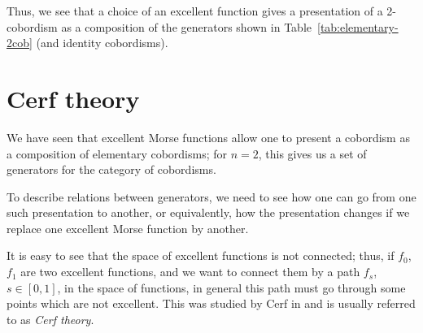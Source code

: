 Thus, we see that a choice of an excellent function gives a presentation of a
2-cobordism as a composition of the generators shown in
Table~\ref{tab:elementary-2cob} (and identity cobordisms).

\section{Cerf theory}\label{s:cerf}

We have seen that excellent Morse functions allow one to present a cobordism as
a composition of elementary cobordisms; for $n=2$, this gives us a set of
generators for the category of cobordisms.



To describe relations between generators, we need to see how one can go from
one such presentation to another, or equivalently, how the presentation changes
if we replace one excellent Morse function by another.

It is easy to see that the space of excellent functions is not connected; thus,
if $f_0$, $f_1$ are two excellent functions, and we want to connect them by a
path $f_s$, $s\in [0,1]$, in the space of functions, in general this path must
go through some points which are not excellent. This was studied by Cerf in
 and is usually referred to as \emph{Cerf theory}.


